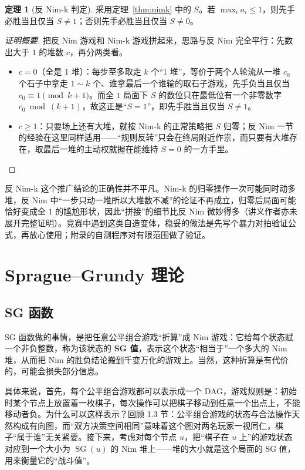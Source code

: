 \documentclass[UTF8,a4paper,11pt,oneside,openany,fontset=fandol]{ctexbook}
\theoremstyle{definition}
\newtheorem{theorem}[definition]{定理}
\newcommand{\SG}{\operatorname{SG}}
\begin{document}
\begin{theorem}[反 Nim-k 判定]\label{thm:antinimk}
采用定理~\ref{thm:nimk} 中的 $S$。若 $\max_i a_i\le1$，则先手必胜当且仅当 $S\ne1$；否则先手必胜当且仅当 $S\ne0$。
\end{theorem}
\begin{proof}[证明概要]
把反 Nim 游戏和 Nim-k 游戏拼起来，思路与反 Nim 完全平行：先数出大于 $1$ 的堆数 $c$，再分两类看。
\begin{itemize}
\item $c=0$（全是 $1$ 堆）：每步至多取走 $k$ 个“$1$ 堆”，等价于两个人轮流从一堆 $c_0$ 个石子中拿走 $1\sim k$ 个、谁拿最后一个谁输的取石子游戏，先手负当且仅当 $c_0\equiv1\pmod{k+1}$。而全 $1$ 局面下 $S$ 的数位只在最低位有一个非零数字 $c_0\bmod(k+1)$，故这正是“$S=1$”，即先手胜当且仅当 $S\ne1$。
\item $c\ge1$：只要场上还有大堆，就按 Nim-k 的正常策略把 $S$ 归零；反 Nim 一节的经验在这里同样适用——“规则反转”只会在终局附近作祟，而只要有大堆存在，取最后一堆的主动权就握在能维持 $S=0$ 的一方手里。
\end{itemize}
\end{proof}

\begin{pitfall}[自造变体先对拍]
反 Nim-k 这个推广结论的正确性并不平凡。Nim-k 的归零操作一次可能同时动多堆，反 Nim 中“一步只动一堆所以大堆数不减”的论证不再成立，归零后局面可能恰好变成全 $1$ 的尴尬形状，因此“拼接”的细节比反 Nim 微妙得多（讲义作者亦未展开完整证明）。竞赛中遇到这类自造变体，稳妥的做法是先写个暴力对拍验证公式，再放心使用；附录的自测程序对有限范围做了验证。
\end{pitfall}

\chapter{Sprague--Grundy 理论}
\section{SG 函数}
SG 函数做的事情，是把任意公平组合游戏“折算”成 Nim 游戏：它给每个状态赋一个非负整数，称为该状态的 \textbf{SG 值}，表示这个状态“相当于”一个多大的 Nim 堆，从而把 Nim 的胜负结论搬到千变万化的游戏上。当然，这种折算是有代价的，可能会损失部分信息。

具体来说，首先，每个公平组合游戏都可以表示成一个 DAG，游戏规则是：初始时某个节点上放置着一枚棋子，每次操作可以把棋子移动到任意一个出点上，不能移动者负。为什么可以这样表示？回顾 1.3 节：公平组合游戏的状态与合法操作天然构成有向图，而“双方决策空间相同”意味着这个图对两名玩家一视同仁，棋子“属于谁”无关紧要。接下来，考虑对每个节点 $u$，把“棋子在 $u$ 上”的游戏状态对应到一个大小为 $\SG(u)$ 的 Nim 堆上——堆的大小就是这个局面的 SG 值，用来衡量它的“战斗值”。
\end{document}
